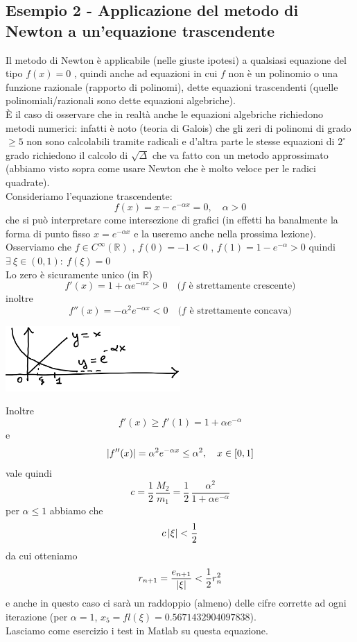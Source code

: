 \documentclass[12pt]{article}
\DeclarePairedDelimiter{\abs}{\lvert}{\rvert}
\begin{document}
\subsection{Esempio 2 - Applicazione del metodo di Newton a un'equazione trascendente}
Il metodo di Newton è applicabile (nelle giuste ipotesi) a qualsiasi equazione del tipo $f(x)=0$ , quindi anche ad equazioni in cui $f$ non è un polinomio o una funzione razionale (rapporto di polinomi), dette equazioni trascendenti (quelle polinomiali/razionali sono dette equazioni algebriche).\\
È il caso di osservare che in realtà anche le equazioni algebriche richiedono metodi numerici: infatti è noto (teoria di Galois) che gli zeri di polinomi di grado $\geq 5$ non sono calcolabili tramite radicali e d'altra parte le stesse equazioni di $2^{\circ}$ grado richiedono il calcolo di $\sqrt{\Delta}$ che va fatto con un metodo approssimato (abbiamo visto sopra come usare Newton che è molto veloce per le radici quadrate). \\
Consideriamo l'equazione trascendente: 
\[f(x)=x-e^{-\alpha x}=0 ,\quad \alpha>0 \]
che si può interpretare come intersezione di grafici (in effetti ha banalmente la forma di punto fisso $x=e^{-\alpha x}$ e la useremo anche nella prossima lezione).\\
Osserviamo che $f \in C^{\infty}(\mathbb{R})$ , $f(0)=-1<0$ , $f(1)=1-e^{-\alpha}>0$ quindi $\exists \  \xi \in (0,1):\ f(\xi)=0$\\
Lo zero è sicuramente unico (in $\mathbb{R}$)\\
\[f'(x)=1+\alpha e^{-\alpha x}>0 \quad \text{($f$ è strettamente crescente)}\]
inoltre \[f''(x)=-\alpha^2 e^{-\alpha x}<0 \quad \text{($f$ è strettamente concava)}\]
\begin{center}
\includegraphics[width=0.5\textwidth]{pag34.png}
\end{center}
Inoltre 
\[ f'(x) \geq f'(1) = 1+ \alpha e^{-\alpha} \]
e
\[ \abs{f''(x)} = \alpha^2 e^{-\alpha x} \leq \alpha^2, \quad x\in[0,1] \]
vale quindi
\[ c = \frac{1}{2}\,\frac{M_2}{m_1} = \frac{1}{2}\,\frac{\alpha^2}{1+\alpha e^{-\alpha}} \]
per $\alpha \leq 1$ abbiamo che 
\[ c\,\abs{\xi} < \frac{1}{2} \]
da cui otteniamo
\begin{equation*}
    r_{n+1} = \frac{e_{n+1}}{\abs{\xi}} < \frac{1}{2}r_n^2
\end{equation*}
e anche in questo caso ci sarà un raddoppio (almeno) delle cifre corrette ad ogni iterazione (per $\alpha = 1$, $x_5=fl(\xi)=0.5671432904097838$).\\
Lasciamo come esercizio i test in Matlab su questa equazione.
\end{document}
